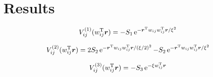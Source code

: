 \chapter{Results}



\begin{equation}
	V_{i j}^{(1)} (w_{i j}^{\mathrm{T}} \boldsymbol{r}) = - S_1 \operatorname{e} ^{- \boldsymbol{r}^{\mathrm{T}} w_{i j} w_{i j}^{\mathrm{T}} \boldsymbol{r} /\xi^2 }	
\end{equation}

\begin{equation}
	V_{i j}^{(2)} (w_{i j}^{\mathrm{T}} \boldsymbol{r}) = 2 S_2 \operatorname{e} ^{- \boldsymbol{r}^{\mathrm{T}} w_{i j} w_{i j}^{\mathrm{T}} \boldsymbol{r} /(\xi /2)^2 } - S_2 \operatorname{e} ^{- \boldsymbol{r}^{\mathrm{T}} w_{i j} w_{i j}^{\mathrm{T}} \boldsymbol{r} /\xi^2 }	
\end{equation}

\begin{equation}
	V_{i j}^{(3)} (w_{i j}^{\mathrm{T}} \boldsymbol{r}) = - S_3 \operatorname{e} ^{- \xi w_{i j}^{\mathrm{T}} \boldsymbol{r} }	
\end{equation}